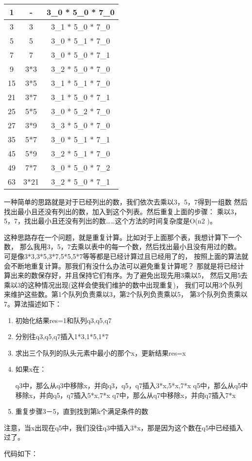 \begin{description}
\begin{table}[!hbp]
\begin{tabular}{|c|c|c|}
\hline
\hline
 1 &  -   & 3\_0  *  5\_0  *  7\_0 \\
\hline
 3 &  3   & 3\_1  *  5\_0  *  7\_0 \\
\hline
 5 &  5   & 3\_0  *  5\_1  *  7\_0 \\
\hline
 7 &  7   & 3\_0  *  5\_0  *  7\_1 \\
\hline
 9 & 3*3  & 3\_2  *  5\_0  *  7\_0 \\
\hline
15 & 3*5  & 3\_1  *  5\_1  *  7\_0 \\
\hline
21 & 3*7  & 3\_1  *  5\_0  *  7\_1 \\
\hline
25 & 5*5  & 3\_0  *  5\_2  *  7\_0 \\
\hline
27 & 3*9  & 3\_3  *  5\_0  *  7\_0 \\
\hline
35 & 5*7  & 3\_0  *  5\_1  *  7\_1 \\
\hline
45 & 5*9  & 3\_2  *  5\_1  *  7\_0 \\
\hline
49 & 7*7  & 3\_0  *  5\_0  *  7\_2 \\
\hline
63 & 3*21 & 3\_2  *  5\_0  *  7\_1 \\
\hline
\hline
\end{tabular}
\end{table}

一种简单的思路就是对于已经列出的数，我们依次去乘以3，5，7得到一组数 然后找出最小且还没有列出的数，加入到这个列表。然后重复上面的步骤： 乘以3，5，7，找出最小且还没有列出的数……这个方法的时间复杂度是O(n2 )。

这种思路存在一个问题，就是重复计算。比如对于上面那个表，我想计算下一个数， 那么我用3，5，7去乘以表中的每一个数，然后找出最小且没有用过的数。 可是像3*3,3*5,3*7,5*5,5*7等等都是已经计算过且已经用了的， 按照上面的算法就会不断地重复计算。那我们有没什么办法可以避免重复计算呢？ 那就是将已经计算出来的数保存好，并且保持它们有序。为了避免出现先用3乘以5， 然后又用5去乘以3的这种情况出现(这样会使我们维护的数中出现重复)， 我们可以用3个队列来维护这些数。第1个队列负责乘以3，第2个队列负责乘以5， 第3个队列负责乘以7。算法描述如下：
\begin{enumerate}
\item 初始化结果res=1和队列q3,q5,q7
\item 分别往q3,q5,q7插入1*3,1*5,1*7
\item 求出三个队列的队头元素中最小的那个x，更新结果res=x
\item 如果x在：
\begin{itemize}
    q3中，那么从q3中移除x，并向q3，q5，q7插入3*x,5*x,7*x
    q5中，那么从q5中移除x，并向q5，q7插入5*x,7*x
    q7中，那么从q7中移除x，并向q7插入7*x
\end{itemize}
\item 重复步骤3－5，直到找到第k个满足条件的数
\end{enumerate}
注意，当x出现在q5中，我们没往q3中插入3*x，那是因为这个数在q5中已经插入过了。

代码如下：


\end{description}
